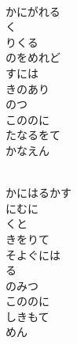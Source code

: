 \documentclass[10pt,b5j]{tarticle} %
\begin{document}
\vspace{1.5em} %
\newcommand{\linespace}{0.5em} %
\newcommand{\blocksize}{0.5\hsize} %
\newcommand{\itemmargin}{6em} %
\begin{enumerate} %
    \setlength{\itemindent}{\itemmargin} %
    \begin{minipage}[c]{\blocksize}
    
        \vspace{\linespace}
        \item~\\
        かにがれる\\
        く\\
        りくる\\
        のをめれど\\
        すには\\
        きのあり\\
        のつ\\
        こののに\\
        たなるをて\\
        かなえん
        
        \vspace{\linespace}
        \item~\\
        かにはるかす\\
        にむに\\
        くと\\
        きをりて\\
        そよぐには\\
        る\\
        のみつ\\
        こののに\\
        しきもて\\
        めん
        

\end{minipage}
\end{enumerate}
\end{document}
